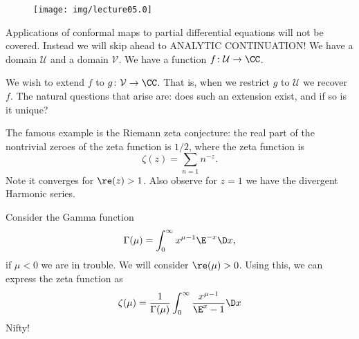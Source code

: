 
\begin{wrapfigure}{r}{1.75in}
\vspace{-40pt}
\begin{center}
\texttt{[image: img/lecture05.0]}
\end{center}
\vspace{-20pt}
\end{wrapfigure}
Applications of conformal maps to partial differential equations
will not be covered. Instead we will skip ahead to ANALYTIC
CONTINUATION! We have a domain $\mathcal{U}$ and a domain
$\mathcal{V}$. We have a function $f\colon\mathcal{U}\to\CC$. 

We wish to extend $f$ to $g\colon\mathcal{V}\to\CC$. That is,
when we restrict $g$ to $\mathcal{U}$ we recover $f$. The natural
questions that arise are: does such an extension exist, and if so
is it unique?

The famous example is the Riemann zeta conjecture: the real part
of the nontrivial zeroes of the zeta function is $1/2$, where the
zeta function is 
\begin{equation}
\zeta(z)=\sum_{n=1}n^{-z}. 
\end{equation}
Note it converges for $\re(z)>1$. Also observe for $z=1$ we have
the divergent Harmonic series.

Consider the Gamma function
\begin{equation}
\Gamma(\mu)=\int^{\infty}_{0}x^{\mu-1}\E^{-x}\D x,
\end{equation}
if $\mu<0$ we are in trouble. We will consider
$\re(\mu)>0$. Using this, we can express the zeta function as
\begin{equation}
\zeta(\mu)=\frac{1}{\Gamma(\mu)}\int^{\infty}_{0}\frac{x^{\mu-1}}{\E^{x}-1}\D
x
\end{equation}
Nifty!

